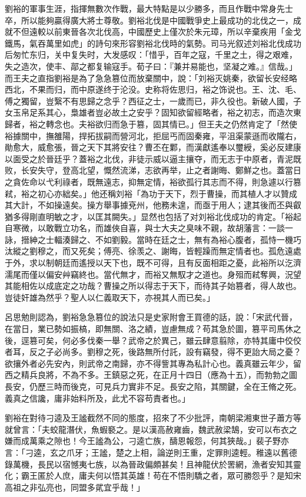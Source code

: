 劉裕的軍事生涯，指揮無數次作戰，最大特點是以少勝多，而且作戰中常身先士卒，所以能夠贏得廣大將士尊敬。劉裕北伐是中國戰爭史上最成功的北伐之一，成就不但遠較以前東晉各次北伐高，中國歷史上僅次於朱元璋，所以辛棄疾用「金戈鐵馬，氣吞萬里如虎」的詩句來形容劉裕北伐時的氣勢。司马光叙述刘裕北伐成功后匆忙东归，关中复失时，大发感叹：「惜乎，百年之寇，千里之土，得之艰难，失之造次，使丰、鄗之都复输寇手。荀子曰：『兼并易能也，坚凝之难。』信哉。」而王夫之直指劉裕是為了急急篡位而放棄關中，說：「刘裕灭姚秦，欲留长安经略西北，不果而归，而中原遂终于沦没。史称将佐思归，裕之饰说也。王、沈、毛、傅之獨留，豈繄不有思歸之念乎？西征之士，一歲而已，非久役也。新破人國，子女玉帛足系其心，梟雄者豈必故土之安乎？固知欲留經略者，裕之初志，而造次東歸者，裕之轉念也。夫裕欲归而急于篡，固其情已。」但王夫之仍然肯定了「然使裕據關中，撫雒陽，捍拓拔嗣而營河北，拒屈丐而固秦雍，平沮渠蒙遜而收隴右，勛愈大，威愈張，晉之天下其將安往？曹丕在鄴，而漢獻遙奉以璽綬，奚必反建康以面受之於晉廷乎？蓋裕之北伐，非徒示威以逼主攘夺，而无志于中原者，青泥既败，长安失守，登高北望，慨然流涕，志欲再举，止之者謝晦、鄭鮮之也。蓋當日之貪佐命以弋利祿者，既無遠志，抑無定情，裕欲孤行其志而不得，則急遽以行篡弒，裕之初心亦絀矣。」他还稱刘裕「為功于天下，烈于曹操，而其植人才以贊成其大計，不如操遠矣。操方舉事據兗州，他務未遑，而亟于用人；逮其後而丕與叡猶多得剛直明敏之才，以匡其闕失。」显然也包括了对刘裕北伐成功的肯定。「裕起自寒微，以敢戰立功名，而雄俠自喜，與士大夫之臭味不親，故胡藩言：一談一詠，搢紳之士輻湊歸之、不如劉毅。當時在廷之士，無有為裕心腹者，孤恃一機巧汰縱之劉穆之，而又死矣；傅亮、徐羡之、謝晦，皆輕躁而無定情者也。孤危遠處于外，求以制朝廷而遙授以天下也，既不可得，且有反面相距之憂，此裕所以汔濟濡尾而僅以偏安艸竊終也。當代無才，而裕又無馭才之道也。身殂而弒奪興，況望其能相佐以成底定之功哉？曹操之所以得志于天下，而待其子始篡者，得人故也。豈徒奸雄為然乎？聖人以仁義取天下，亦視其人而已矣。」

呂思勉則認為，劉裕急急篡位的說法只是史家附會王買德的話，說：「宋武代晉，在當日，業已勢如振槁，即無關、洛之績，豈慮無成？苟其急於圖，篡平司馬休之後，逕篡可矣，何必多伐秦一舉？武帝之於異己，雖云肆意翦除，亦特其庸中佼佼者耳，反之子必尚多。劉穆之死，後路無所付託，設有竊發，得不更詒大局之憂？欲攘外者必先安內，則武帝之南歸，亦不得訾其專為私計心也。義真雖云年少，留西之精兵良將，不為不多。王鎮惡之死，在正月十四日（應為十五），而勃勃之圖長安，仍歷三時而後克，可見兵力實非不足。長安之陷，其關鍵，全在王脩之死。義真之信讒，庸非始料所及，此尤不容苟責者也。」

劉裕在對待刁逵及王謐截然不同的態度，招來了不少批評，南朝梁湘東世子蕭方等就曾言：「夫蛟龍潛伏，魚蝦褻之。是以漢高赦雍齒，魏武赦梁鵠，安可以布衣之嫌而成萬乘之隙也！今王謐為公，刁逵亡族，醻恩報怨，何其狹哉。」裴子野亦言：「刁逵，玄之爪牙；王謐，楚之上相，論逆則王重，定罪則逵輕。稚遠以舊德錄萬機，長民以宿憾夷七族，以為晉政偏頗甚矣！且神龍伏於罟網，漁者安知其靈化；霸王匿於人庶，庸夫何以悟其英雄！苟在不悟則驕之者，眾可勝怨乎？是知宋高祖之非弘亮也，同盟多貮宜乎哉！」

